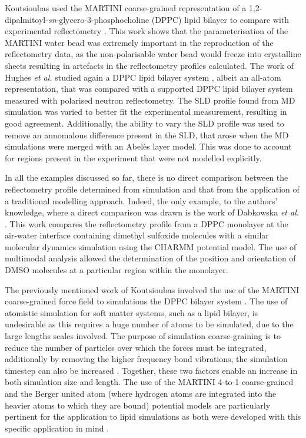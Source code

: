 Koutsioubas used the MARTINI coarse-grained representation of a 1,2-dipalmitoyl-\emph{sn}-glycero-3-phosphocholine (DPPC) lipid bilayer to compare with experimental reflectometry \cite{koutsioubas_combined_2016}.
This work shows that the parameterisation of the MARTINI water bead was extremely important in the reproduction of the reflectometry data, as the non-polarisable water bead would freeze into crystalline sheets resulting in artefacts in the reflectometry profiles calculated.
The work of Hughes \emph{et al.} studied again a DPPC lipid bilayer system \cite{hughes_interpretation_2016}, albeit an all-atom representation, that was compared with a supported DPPC lipid bilayer system measured with polarised neutron reflectometry.
The SLD profile found from MD simulation was varied to better fit the experimental measurement, resulting in good agreement.
Additionally, the ability to vary the SLD profile was used to remove an annomalous difference present in the SLD, that arose when the MD simulations were merged with an Abel\`{e}s layer model.
This was done to account for regions present in the experiment that were not modelled explicitly.

In all the examples discussed so far, there is no direct comparison between the reflectometry profile determined from simulation and that from the application of a traditional modelling approach.
Indeed, the only example, to the authors' knowledge, where a direct comparison was drawn is the work of Dabkowska \emph{et al.} \cite{dabkowska_modulation_2014}.
This work compares the reflectometry profile from a DPPC monolayer at the air-water interface containing dimethyl sulfoxide molecules with a similar molecular dynamics simulation using the CHARMM potential model.
The use of multimodal analysis allowed the determination of the position and orientation of DMSO molecules at a particular region within the monolayer.

The previously mentioned work of Koutsioubas involved the use of the MARTINI coarse-grained force field to simulations the DPPC bilayer system \cite{koutsioubas_combined_2016}.
The use of atomistic simulation for soft matter systems, such as a lipid bilayer, is undesirable as this requires a huge number of atoms to be simulated, due to the large lengths scales involved.
The purpose of simulation coarse-graining is to reduce the number of particles over which the forces must be integrated, additionally by removing the higher frequency bond vibrations, the simulation timestep can also be increased \cite{pluhackova_biomembranes_2015}.
Together, these two factors enable an increase in both simulation size and length.
The use of the MARTINI 4-to-1 coarse-grained and the Berger united atom (where hydrogen atoms are integrated into the heavier atoms to which they are bound) potential models are particularly pertinent for the application to lipid simulations as both were developed with this specific application in mind \cite{marrink_martini_2007,berger_molecular_1997}.

